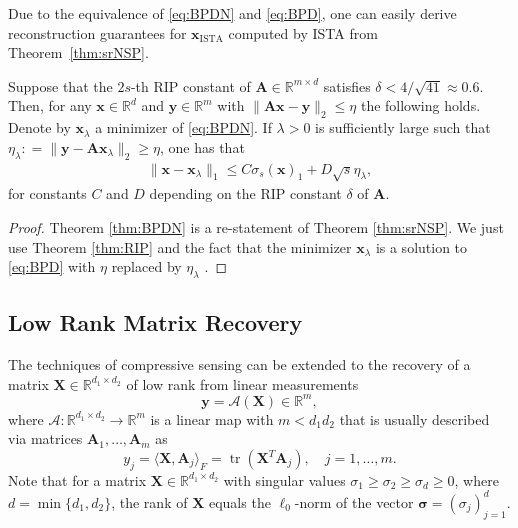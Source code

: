 \documentclass{svproc}
\newcommand{\corr}[1]{#1}
\newcommand{\bA}{\boldsymbol{A}}
\newcommand{\bx}{\boldsymbol{x}}
\newcommand{\bX}{\boldsymbol{X}}
\newcommand{\by}{\boldsymbol{y}}
\newcommand{\0}{\boldsymbol{0}}
\newcommand{\1}{\boldsymbol{1}}
\def\R{\mathbb{R}}
\begin{document}
Due to the equivalence of \eqref{eq:BPDN} and \eqref{eq:BPD}, one can easily derive reconstruction guarantees for $\bx_{\text{ISTA}}$ computed by ISTA from Theorem~\ref{thm:srNSP}.

\begin{theorem} \label{thm:BPDN}
    Suppose that the $2s$-th RIP constant of $\bA \in \R^{m \times d}$ satisfies $\delta < 4/\sqrt{41} \approx 0.6$. Then, for any $\bx \in \R^d$ and $\by \in \R^m$ with $\|\bA\bx -\by\|_2 \leq \eta$ the following holds. Denote by $\bx_\lambda$ a minimizer of \eqref{eq:BPDN}. If $\lambda > 0$ is sufficiently large such that $\eta_\lambda \colon= \| \by - \bA\bx_\lambda \|_2 \ge \eta$, one has that
    \begin{align*}
        \|\bx - \bx_\lambda \|_1 \leq C \sigma_s(\bx)_1 + D\sqrt{s} \eta_\lambda,
    \end{align*}
    for constants $C$ and $D$ depending on the RIP constant $\delta$ of $\bA$.
\end{theorem}
%
\begin{proof}
    Theorem \ref{thm:BPDN} is a re-statement of Theorem \ref{thm:srNSP}. We just use Theorem \ref{thm:RIP} and the fact that the minimizer $\bx_\lambda$ is a solution to \eqref{eq:BPD} with $\eta$ replaced by $\eta_\lambda$ \cite[Proposition 3.2]{foucart2013mathematical}.
\end{proof}

\subsection{Low Rank Matrix Recovery}
\label{sec:LowRank}

The techniques of compressive sensing can be extended to the recovery of a matrix $\bX \in \R^{d_1 \times d_2}$ of low rank from linear measurements
\begin{equation}\label{matrix-measurements}
\by = \mathcal{A}(\bX) \in \R^m,
\end{equation}
where $\mathcal{A} : \corr{\R^{d_1 \times d_2}} \to \R^m$ is a linear map with $m < d_1 d_2$ that is usually described via matrices \corr{$\bA_1,\hdots,\bA_m$} as
\begin{equation}\label{matrix-meas}
y_j = \langle \bX, \bA_j \rangle_F = \operatorname{tr}(\bX^T \bA_j), \quad j=1,\hdots, m.
\end{equation}
Note that for a matrix $\bX \in \R^{d_1 \times d_2}$ with singular values $\sigma_1\geq \sigma_2 \geq \sigma_d \geq 0$, where $d = \min\{d_1,d_2\}$, the rank of $\bX$ equals the $\ell_0$-norm of the vector $\boldsymbol{\sigma} = (\sigma_j)_{j=1}^d$. 
\end{document}
